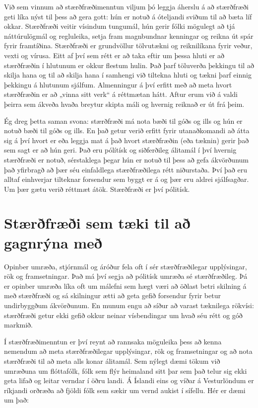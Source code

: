 \documentclass[
  icelandic,
]{book}
\theoremstyle{definition}
\theoremstyle{definition}
\theoremstyle{definition}
\theoremstyle{definition}
\theoremstyle{remark}
\begin{document}
Við sem vinnum að stærðfræðimenntun viljum þó leggja áherslu á að stærðfræði geti líka nýst til þess að gera gott: hún er notuð á óteljandi sviðum til að bæta líf okkar. Stærðfræði veitir vísindum tungumál, hún gerir fólki mögulegt að tjá náttúrulögmál og regluleika, setja fram magnbundnar kenningar og reikna út spár fyrir framtíðina. Stærðfræði er grundvöllur tölvutækni og reiknilíkana fyrir veður, vexti og vírusa. Eitt af því sem rétt er að taka eftir um þessa hluti er að stærðfræðin í hlutunum er okkur flestum hulin. Það þarf töluverða þekkingu til að skilja hana og til að skilja hana í samhengi við tiltekna hluti og tækni þarf einnig þekkingu á hlutunum sjálfum. Almenningur á því erfitt með að meta hvort stærðfræðin er að „vinna sitt verk`` á réttmætan hátt. Aftur erum við á valdi þeirra sem ákveða hvaða breytur skipta máli og hvernig reiknað er út frá þeim.

Ég dreg þetta saman svona: stærðfræði má nota bæði til góðs og ills og hún er notuð bæði til góðs og ills. En það getur verið erfitt fyrir utanaðkomandi að átta sig á því hvort er eða leggja mat á það hvort stærðfræðin (eða tæknin) gerir það sem sagt er að hún geri. Það eru pólítísk og siðferðileg álitamál í því hvernig stærðfræði er notuð, sérstaklega þegar hún er notuð til þess að gefa ákvörðunum það yfirbragð að þær séu einfaldlega stærðfræðilega rétt niðurstaða. Því það eru alltaf einhverjar tilteknar forsendur sem byggt er á og þær eru aldrei sjálfsagðar. Um þær gætu verið réttmæt átök. Stærðfræði er því pólitísk.

\section{Stærðfræði sem tæki til að gagnrýna með}\label{stae_taeki_ryni}

Opinber umræða, stjórnmál og áróður fela oft í sér stærðfræðilegar upplýsingar, rök og framsetningar. Það má því segja að pólitísk umræða sé stærðfræðileg. Þá er opinber umræða líka oft um málefni sem hægt væri að öðlast betri skilning á með stærðfræði og sá skilningur ætti að geta gefið forsendur fyrir betur undirbyggðum ákvörðunum. En munum engu að síður að varast tæknilega rökvísi: stærðfræði getur ekki gefið okkur neinar vísbendingar um hvað séu rétt og góð markmið.

Í stærðfræðimenntun er því reynt að rannsaka möguleika þess að kenna nemendum að meta stærðfræðilegar upplýsingar, rök og framsetningar og að nota stærðfræði til að meta alls konar álitamál. Sem nýlegt dæmi tökum við umræðuna um flóttafólk, fólk sem flýr heimaland sitt þar sem það telur sig ekki geta lifað og leitar verndar í öðru landi. Á Íslandi eins og víðar á Vesturlöndum er ríkjandi orðræða að fjöldi fólk sem sækir um vernd aukist í sífellu. Hér er dæmi um það:
\end{document}
